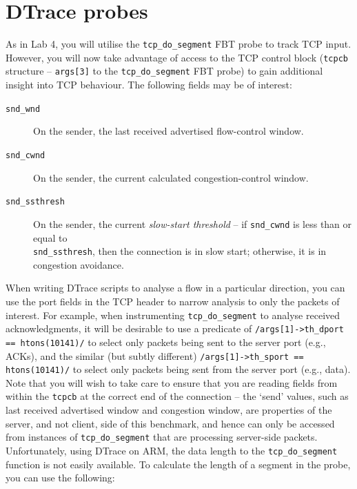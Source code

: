 \documentclass[a4paper,10pt]{article}
\begin{document}
\section*{DTrace probes}

%
%
As in Lab 4, you will utilise the \texttt{tcp\_do\_segment} FBT probe to track
TCP input.
However, you will now take advantage of access to the TCP control block
(\texttt{tcpcb} structure -- \texttt{args[3]} to the \texttt{tcp\_do\_segment}
FBT probe) to gain additional insight into TCP behaviour.
The following fields may be of interest:

\begin{description}
\item[\texttt{snd\_wnd}] On the sender, the last received advertised
  flow-control window.
\item[\texttt{snd\_cwnd}] On the sender, the current calculated
  congestion-control window.
\item[\texttt{snd\_ssthresh}] On the sender, the current \textit{slow-start
  threshold} -- if \texttt{snd\_cwnd} is less than or equal to \\
  \texttt{snd\_ssthresh},
  then the connection is in slow start; otherwise, it is in congestion
  avoidance.
\end{description}

When writing DTrace scripts to analyse a flow in a particular direction, you
can use the port fields in the TCP header to narrow analysis to only the
packets of interest.
For example, when instrumenting \texttt{tcp\_do\_segment} to analyse received
acknowledgments, it will be desirable to use a predicate of
\texttt{/args[1]->th\_dport == htons(10141)/} to select only packets being
sent to the server port (e.g., ACKs), and the similar (but subtly different)
\texttt{/args[1]->th\_sport == htons(10141)/} to select only packets being
sent from the server port (e.g., data).
Note that you will wish to take care to ensure that you are reading fields
from within the \texttt{tcpcb} at the correct end of the connection -- the
`send' values, such as last received advertised window and congestion window,
are properties of the server, and not client, side of this benchmark, and
hence can only be accessed from instances of \texttt{tcp\_do\_segment} that
are processing server-side packets.
Unfortunately, using DTrace on ARM, the data length to the \texttt{tcp\_do\_segment} function is not easily available.
To calculate the length of a segment in the probe, you can use the following:
\end{document}
